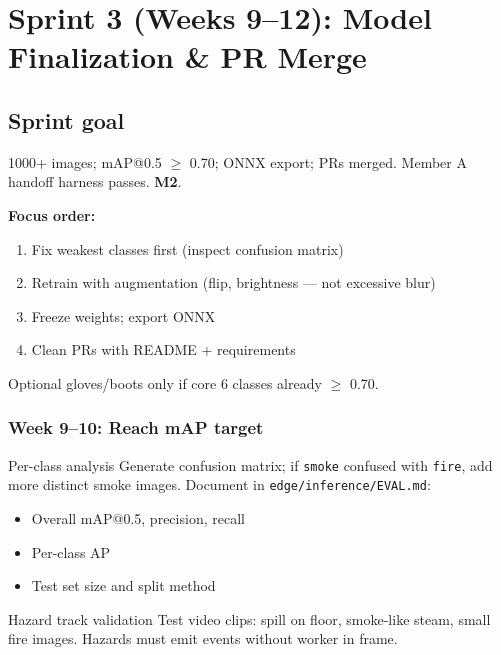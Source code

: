 \documentclass[12pt,a4paper]{report}
\begin{document}
\chapter{Sprint 3 (Weeks 9--12): Model Finalization \& PR Merge}

\section{Sprint goal}

1000+ images; mAP@0.5 $\geq$ 0.70; ONNX export; PRs merged. Member A handoff harness passes. \textbf{M2}.

\begin{approachbox}
\textbf{Focus order:}
\begin{enumerate}
    \item Fix weakest classes first (inspect confusion matrix)
    \item Retrain with augmentation (flip, brightness --- not excessive blur)
    \item Freeze weights; export ONNX
    \item Clean PRs with README + requirements
\end{enumerate}
Optional gloves/boots only if core 6 classes already $\geq$ 0.70.
\end{approachbox}

\subsection{Week 9--10: Reach mAP target}

\begin{stepbox}{Per-class analysis}
Generate confusion matrix; if \texttt{smoke} confused with \texttt{fire}, add more distinct smoke images. Document in \texttt{edge/inference/EVAL.md}:
\begin{itemize}
    \item Overall mAP@0.5, precision, recall
    \item Per-class AP
    \item Test set size and split method
\end{itemize}
\end{stepbox}

\begin{stepbox}{Hazard track validation}
Test video clips: spill on floor, smoke-like steam, small fire images. Hazards must emit events without worker in frame.
\end{stepbox}
\end{document}
